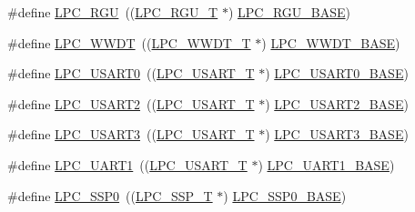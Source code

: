 \begin{DoxyCompactItemize}
\item 
\#define \hyperlink{group___p_e_r_i_p_h__43_x_x___b_a_s_e_gab631e0dff2443a7a1e4fa99c9a6fe88e}{L\+P\+C\+\_\+\+R\+GU}~((\hyperlink{struct_l_p_c___r_g_u___t}{L\+P\+C\+\_\+\+R\+G\+U\+\_\+T}              $\ast$) \hyperlink{group___p_e_r_i_p_h__43_x_x___b_a_s_e_gaff6de015a63620b4c552891c1ac9f756}{L\+P\+C\+\_\+\+R\+G\+U\+\_\+\+B\+A\+SE})
\item 
\#define \hyperlink{group___p_e_r_i_p_h__43_x_x___b_a_s_e_ga235e068b1412366044449dba68194c55}{L\+P\+C\+\_\+\+W\+W\+DT}~((\hyperlink{struct_l_p_c___w_w_d_t___t}{L\+P\+C\+\_\+\+W\+W\+D\+T\+\_\+T}             $\ast$) \hyperlink{group___p_e_r_i_p_h__43_x_x___b_a_s_e_ga9b83c39ba53f9c9e87974984c96e35de}{L\+P\+C\+\_\+\+W\+W\+D\+T\+\_\+\+B\+A\+SE})
\item 
\#define \hyperlink{group___p_e_r_i_p_h__43_x_x___b_a_s_e_ga3255c792adeee40643c8f5c32e852107}{L\+P\+C\+\_\+\+U\+S\+A\+R\+T0}~((\hyperlink{struct_l_p_c___u_s_a_r_t___t}{L\+P\+C\+\_\+\+U\+S\+A\+R\+T\+\_\+T}            $\ast$) \hyperlink{group___p_e_r_i_p_h__43_x_x___b_a_s_e_gaa878cf5cffe359eaf1eba511ab537ba9}{L\+P\+C\+\_\+\+U\+S\+A\+R\+T0\+\_\+\+B\+A\+SE})
\item 
\#define \hyperlink{group___p_e_r_i_p_h__43_x_x___b_a_s_e_gae6539c90608a0da79ee287639201fc6c}{L\+P\+C\+\_\+\+U\+S\+A\+R\+T2}~((\hyperlink{struct_l_p_c___u_s_a_r_t___t}{L\+P\+C\+\_\+\+U\+S\+A\+R\+T\+\_\+T}            $\ast$) \hyperlink{group___p_e_r_i_p_h__43_x_x___b_a_s_e_gac377e7801bf13eb388b8f2cbdc61091f}{L\+P\+C\+\_\+\+U\+S\+A\+R\+T2\+\_\+\+B\+A\+SE})
\item 
\#define \hyperlink{group___p_e_r_i_p_h__43_x_x___b_a_s_e_ga206737c2cfff0f9dcaac507068711310}{L\+P\+C\+\_\+\+U\+S\+A\+R\+T3}~((\hyperlink{struct_l_p_c___u_s_a_r_t___t}{L\+P\+C\+\_\+\+U\+S\+A\+R\+T\+\_\+T}            $\ast$) \hyperlink{group___p_e_r_i_p_h__43_x_x___b_a_s_e_gabe7b830995c08b4b9ecd941f14c2a593}{L\+P\+C\+\_\+\+U\+S\+A\+R\+T3\+\_\+\+B\+A\+SE})
\item 
\#define \hyperlink{group___p_e_r_i_p_h__43_x_x___b_a_s_e_ga83ea0dab4dcb7411c2e1de20050a4d2d}{L\+P\+C\+\_\+\+U\+A\+R\+T1}~((\hyperlink{struct_l_p_c___u_s_a_r_t___t}{L\+P\+C\+\_\+\+U\+S\+A\+R\+T\+\_\+T}            $\ast$) \hyperlink{group___p_e_r_i_p_h__43_x_x___b_a_s_e_ga18e8f96b25e3f343bdd7ba552ae7a617}{L\+P\+C\+\_\+\+U\+A\+R\+T1\+\_\+\+B\+A\+SE})
\item 
\#define \hyperlink{group___p_e_r_i_p_h__43_x_x___b_a_s_e_gac213e0325a8e8a972bd2e0dd6ccf353c}{L\+P\+C\+\_\+\+S\+S\+P0}~((\hyperlink{struct_l_p_c___s_s_p___t}{L\+P\+C\+\_\+\+S\+S\+P\+\_\+T}              $\ast$) \hyperlink{group___p_e_r_i_p_h__43_x_x___b_a_s_e_ga53fb1af80b541545988f2a966681abfd}{L\+P\+C\+\_\+\+S\+S\+P0\+\_\+\+B\+A\+SE})

\end{DoxyCompactItemize}
